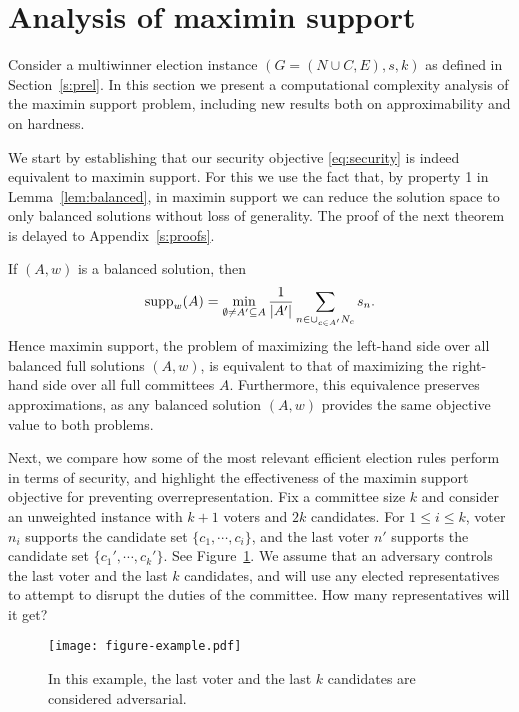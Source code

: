 \section{Analysis of maximin support}\label{s:complexity}

Consider a multiwinner election instance $(G=(N\cup C, E), s, k)$ as defined in Section~\ref{s:prel}. 
In this section we present a computational complexity analysis of the maximin support problem, including new results both on approximability and on hardness. 

We start by establishing that our security objective \eqref{eq:security} is indeed equivalent to maximin support.
For this we use the fact that, by property 1 in Lemma~\ref{lem:balanced}, in maximin support we can reduce the solution space to only balanced solutions without loss of generality. 
The proof of the next theorem is delayed to Appendix~\ref{s:proofs}.

\begin{theorem} \label{thm:equivalence} 
If $(A,w)$ is a balanced solution, then
$$\operatorname{supp}_w(A) = \min_{\emptyset\neq A' \subseteq A} \frac{1}{|A'|} \sum_{n\in \cup_{c\in A'} N_c} s_n.$$
Hence maximin support, the problem of maximizing the left-hand side over all balanced full solutions $(A,w)$, 
is equivalent to that of maximizing the right-hand side over all full committees $A$. 
Furthermore, this equivalence preserves approximations, as any balanced solution $(A,w)$ provides the same objective value to both problems.
\end{theorem}

Next, we compare how some of the most relevant efficient election rules perform in terms of security, and highlight the effectiveness of the maximin support objective for preventing overrepresentation. 
Fix a committee size $k$ and consider an unweighted instance with $k+1$ voters and $2k$ candidates. 
For $1\leq i\leq k$, voter $n_i$ supports the candidate set $\{c_1, \cdots, c_i\}$, and the last voter $n'$ supports the candidate set $\{c_1', \cdots, c_k'\}$. See Figure~\ref{fig:example}.
%
We assume that an adversary controls the last voter and the last $k$ candidates, and will use any elected representatives to attempt to disrupt the duties of the committee. 
How many representatives will it get? 

\begin{figure}[tb]
  \centering
	\texttt{[image: figure-example.pdf]}
  \caption{In this example, the last voter and the last $k$ candidates are considered adversarial.}
  \label{fig:example}
\end{figure}

